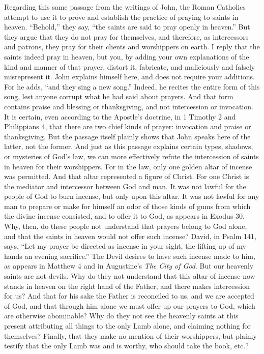 Regarding this same passage from the writings of John, the Roman Catholics attempt to use it to prove and establish the practice of praying to saints in heaven. “Behold,” they say, “the saints are said to pray openly in heaven.” But they argue that they do not pray for themselves, and therefore, as intercessors and patrons, they pray for their clients and worshippers on earth. I reply that the saints indeed pray in heaven, but you, by adding your own explanations of the kind and manner of that prayer, distort it, fabricate, and maliciously and falsely misrepresent it. John explains himself here, and does not require your additions. For he adds, “and they sing a new song.” Indeed, he recites the entire form of this song, lest anyone corrupt what he had said about prayers. And that form contains praise and blessing or thanksgiving, and not intercession or invocation. It is certain, even according to the Apostle’s doctrine, in 1 Timothy 2 and Philippians 4, that there are two chief kinds of prayer: invocation and praise or thanksgiving. But the passage itself plainly shows that John speaks here of the latter, not the former. And just as this passage explains certain types, shadows, or mysteries of God’s law, we can more effectively refute the intercession of saints in heaven for their worshippers. For in the law, only one golden altar of incense was permitted. And that altar represented a figure of Christ. For one Christ is the mediator and intercessor between God and man. It was not lawful for the people of God to burn incense, but only upon this altar. It was not lawful for any man to prepare or make for himself an odor of those kinds of gums from which the divine incense consisted, and to offer it to God, as appears in Exodus 30. Why, then, do these people not understand that prayers belong to God alone, and that the saints in heaven would not offer such incense? David, in Psalm 141, says, “Let my prayer be directed as incense in your sight, the lifting up of my hands an evening sacrifice.” The Devil desires to have such incense made to him, as appears in Matthew 4 and in Augustine’s \textit{The City of God}. But our heavenly saints are not devils. Why do they not understand that this altar of incense now stands in heaven on the right hand of the Father, and there makes intercession for us? And that for his sake the Father is reconciled to us, and we are accepted of God, and that through him alone we must offer up our prayers to God, which are otherwise abominable? Why do they not see the heavenly saints at this present attributing all things to the only Lamb alone, and claiming nothing for themselves? Finally, that they make no mention of their worshippers, but plainly testify that the only Lamb was and is worthy, who should take the book, etc.?

